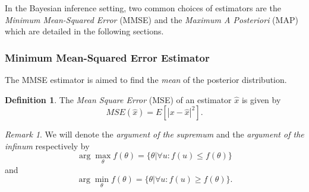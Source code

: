 \documentclass{article}
\theoremstyle{definition}
\newtheorem{definition}[thm]{Definition}
\theoremstyle{remark}
\newtheorem{remark}[thm]{Remark}
\begin{document}

In the Bayesian inference setting, two common choices of estimators are the \emph{Minimum Mean-Squared Error} (MMSE) and the \emph{Maximum A Posteriori} (MAP) which are detailed in the following sections.








\subsubsection{Minimum Mean-Squared Error Estimator}
The MMSE estimator is aimed to find the \emph{mean} of the posterior distribution.

\begin{definition}
The \emph{Mean Square Error} (MSE) of an estimator $\hat{x}$ is given by
\begin{equation}
MSE(\hat{x})=E[|x-\hat{x}|^2].
\end{equation}
\end{definition}

\begin{remark}
We will denote the \emph{argument of the supremum} and the \emph{argument of the infinum} respectively by
$$\arg\max_\theta f(\theta)=\{\theta|\forall u: f(u) \leq f(\theta )\}$$
and
$$\arg\min_\theta f(\theta)=\{\theta|\forall u: f(u) \geq f(\theta )\}.$$
\end{remark}
\end{document}
